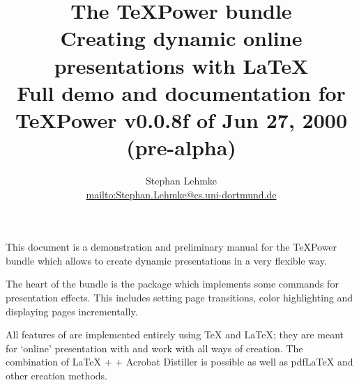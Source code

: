 \usepackage{graphicx}


\usepackage{amsmath}
\delimitershortfall-1sp



\usepackage{soul}





%

\begin{slide}
%
%
  \title
  {%
    The \TeX Power bundle\\
    {%
      \normalfont
      Creating dynamic online presentations with \LaTeX\\
      Full demo and documentation for \TeX Power v0.0.8f of Jun 27, 2000 (pre-alpha)%
      }%
    }

  \author{Stephan Lehmke\\\url{mailto:Stephan.Lehmke@cs.uni-dortmund.de}}

  \maketitle

  \newslide

  This document is a demonstration and preliminary manual for the \TeX Power bundle which allows to create dynamic
  presentations in a very flexible way.

  The heart of the bundle is the package  which implements some commands for presentation effects. This
  includes setting page transitions, color highlighting and displaying pages incrementally.

  All features of  are implemented entirely using \TeX{} and \LaTeX; they are meant for `online'
  presentation with  and work with all ways of 
  creation. The combination of \LaTeX{} +  + Acrobat Distiller is possible as well as pdf\LaTeX{} and other
   creation methods.

  \newslide


\end{slide}
